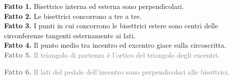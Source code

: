\documentclass[a4paper]{article}
\theoremstyle{remark}
\theoremstyle{definition}
\begin{document}
\begin{multicols}{2}
\textbf{Fatto 1.} Bisettrice interna ed esterna sono perpendicolari. \\

\textbf{Fatto 2.} Le bisettrici concorrono a tre a tre. \\

\textbf{Fatto 3.} I punti in cui concorrono le bisettrici estere sono centri delle circonferenze tangenti esternamente ai lati. \\

\textbf{Fatto 4.} Il punto medio tra incentro ed excentro giace sulla circoscritta. \\

\textcolor{gray}{\textbf{Fatto 5.} Il triangolo di partenza è l'ortico del triangolo degli excentri. \\
} %

\textcolor{gray}{\textbf{Fatto 6.} Il lati del pedale dell'incentro sono perpendicolari alle bisettrici.  \\
}

\end{multicols}
\end{document}
